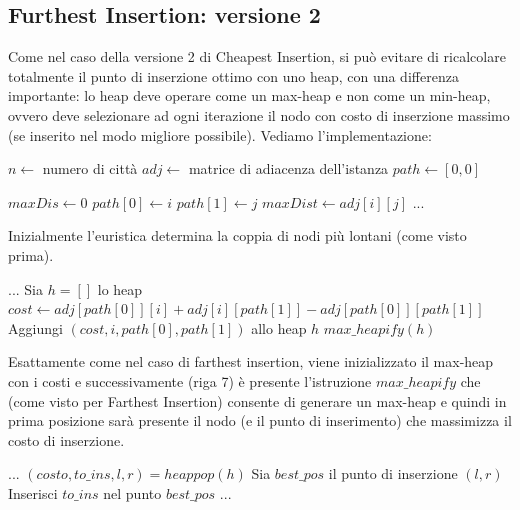\documentclass[a4paper,12pt]{report}
\begin{document}
\subsection{Furthest Insertion: versione 2}
Come nel caso della versione 2 di Cheapest Insertion, si può evitare di ricalcolare totalmente il punto di inserzione ottimo con uno heap, con una differenza importante: lo heap deve operare come un max-heap e non come un min-heap, ovvero deve selezionare ad ogni iterazione il nodo con costo di inserzione massimo (se inserito nel modo migliore possibile). Vediamo l'implementazione:
\begin{tcolorbox}[colframe=black, colback=white, boxrule=0.5pt, title=Furthest Insertion Versione 2, coltitle=black, fonttitle=\bfseries, colbacktitle=white, breakable]
  \begin{algorithmic}[1]
    \State $n \gets$ numero di città
    \State $adj \gets$ matrice di adiacenza dell'istanza
    \State $path \gets [0, 0]$
    
    \State $maxDis \gets 0$
          \State $path[0] \gets i$
          \State $path[1] \gets j$
          \State $maxDist \gets adj[i][j]$
        \EndIf
      \EndFor
    \EndFor
    \State ...
  \end{algorithmic}
\end{tcolorbox}
Inizialmente l'euristica determina la coppia di nodi più lontani (come visto prima).
\begin{tcolorbox}[colframe=black, colback=white, boxrule=0.5pt, title=Furthest Insertion Versione 2, coltitle=black, fonttitle=\bfseries, colbacktitle=white, breakable]
  \begin{algorithmic}[1]
    \State ...
    \State Sia $h = []$ lo heap
      \State $cost \gets adj[path[0]][i] + adj[i][path[1]] - adj[path[0]][path[1]]$
      \State Aggiungi $(cost, i, path[0], path[1])$ allo heap $h$
    \EndFor
    \State $max\_heapify(h)$
  \end{algorithmic}
\end{tcolorbox}
Esattamente come nel caso di farthest insertion, viene inizializzato il max-heap con i costi e successivamente (riga 7) è presente l'istruzione $max\_heapify$ che (come visto per Farthest Insertion) consente di generare un max-heap e quindi in prima posizione sarà presente il nodo (e il punto di inserimento) che massimizza il costo di inserzione.
\begin{tcolorbox}[colframe=black, colback=white, boxrule=0.5pt, title=Furthest Insertion Versione 2, coltitle=black, fonttitle=\bfseries, colbacktitle=white, breakable]
  \begin{algorithmic}[1]
    \State ...
      \State $(costo, to\_ins, l, r) = heappop(h)$
      \State Sia $best\_pos$ il punto di inserzione $(l, r)$
      \State Inserisci $to\_ins$ nel punto $best\_pos$
      \State ...
    \EndWhile
  \end{algorithmic}
\end{tcolorbox}
\end{document}
